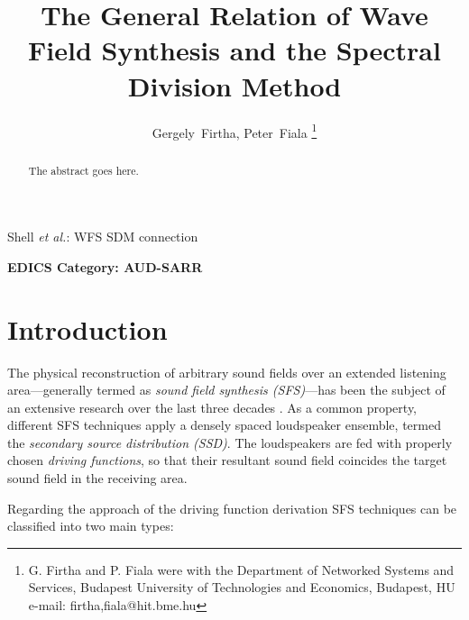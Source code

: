 \documentclass[journal]{IEEEtran}
\begin{document}
\title{The General Relation of Wave Field Synthesis and the Spectral Division Method}

\author{Gergely~Firtha,
        Peter~Fiala
\thanks{G. Firtha and P. Fiala were with the Department
of Networked Systems and Services, Budapest University of Technologies and Economics, Budapest,
HU e-mail: {firtha,fiala}@hit.bme.hu}}%
%
%
{Shell \MakeLowercase{\textit{et al.}}: WFS SDM connection}

\maketitle

\begin{abstract}
The abstract goes here.
\end{abstract}

\begin{center} \bfseries EDICS Category: AUD-SARR \end{center}



\section{Introduction}

The physical reconstruction of arbitrary sound fields over an extended listening area---generally termed as \emph{sound field synthesis (SFS)}---has been the subject of an extensive research over the last three decades \cite{Spors2013}.
As a common property, different SFS techniques apply a densely spaced loudspeaker ensemble, termed the \emph{secondary source distribution (SSD)}. 
The loudspeakers are fed with properly chosen \emph{driving functions}, so that their resultant sound field coincides the target sound field in the receiving area.

Regarding the approach of the driving function derivation SFS techniques can be classified into two main types:
\end{document}
